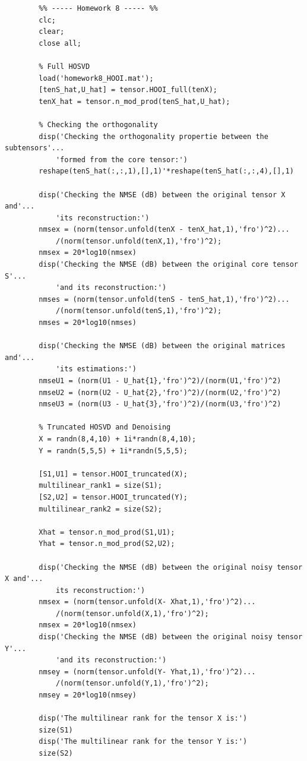 \documentclass[a4paper,10pt]{article}
\begin{document}
\begin{verbatim}
        %% ----- Homework 8 ----- %%
        clc;
        clear;
        close all;

        % Full HOSVD
        load('homework8_HOOI.mat');
        [tenS_hat,U_hat] = tensor.HOOI_full(tenX);
        tenX_hat = tensor.n_mod_prod(tenS_hat,U_hat);

        % Checking the orthogonality
        disp('Checking the orthogonality propertie between the subtensors'...
            'formed from the core tensor:')
        reshape(tenS_hat(:,:,1),[],1)'*reshape(tenS_hat(:,:,4),[],1)

        disp('Checking the NMSE (dB) between the original tensor X and'...
            'its reconstruction:')
        nmsex = (norm(tensor.unfold(tenX - tenX_hat,1),'fro')^2)...
            /(norm(tensor.unfold(tenX,1),'fro')^2);
        nmsex = 20*log10(nmsex)
        disp('Checking the NMSE (dB) between the original core tensor S'...
            'and its reconstruction:')
        nmses = (norm(tensor.unfold(tenS - tenS_hat,1),'fro')^2)...
            /(norm(tensor.unfold(tenS,1),'fro')^2);
        nmses = 20*log10(nmses)

        disp('Checking the NMSE (dB) between the original matrices and'...
            'its estimations:')
        nmseU1 = (norm(U1 - U_hat{1},'fro')^2)/(norm(U1,'fro')^2)
        nmseU2 = (norm(U2 - U_hat{2},'fro')^2)/(norm(U2,'fro')^2)
        nmseU3 = (norm(U3 - U_hat{3},'fro')^2)/(norm(U3,'fro')^2)

        % Truncated HOSVD and Denoising
        X = randn(8,4,10) + 1i*randn(8,4,10);
        Y = randn(5,5,5) + 1i*randn(5,5,5);

        [S1,U1] = tensor.HOOI_truncated(X);
        multilinear_rank1 = size(S1);
        [S2,U2] = tensor.HOOI_truncated(Y);
        multilinear_rank2 = size(S2);

        Xhat = tensor.n_mod_prod(S1,U1);
        Yhat = tensor.n_mod_prod(S2,U2);

        disp('Checking the NMSE (dB) between the original noisy tensor X and'...
            its reconstruction:')
        nmsex = (norm(tensor.unfold(X- Xhat,1),'fro')^2)...
            /(norm(tensor.unfold(X,1),'fro')^2);
        nmsex = 20*log10(nmsex)
        disp('Checking the NMSE (dB) between the original noisy tensor Y'...
            'and its reconstruction:')
        nmsey = (norm(tensor.unfold(Y- Yhat,1),'fro')^2)...
            /(norm(tensor.unfold(Y,1),'fro')^2);
        nmsey = 20*log10(nmsey)

        disp('The multilinear rank for the tensor X is:')
        size(S1)
        disp('The multilinear rank for the tensor Y is:')
        size(S2)
    \end{verbatim}
    
\end{document}
